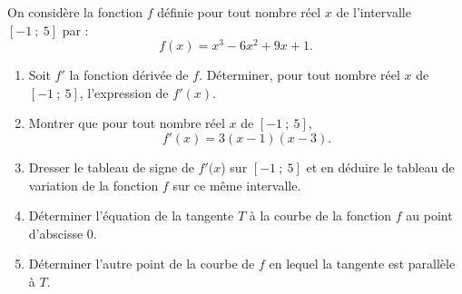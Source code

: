 \medskip

On considère la fonction $f$ définie pour tout nombre réel $x$  de l'intervalle $[-1~;~5]$ par : \[f(x)=x^3-6x^2+9x+1.\]

\begin{enumerate}
\item  Soit $f'$ la fonction dérivée de $f$. Déterminer, pour tout nombre réel $x$ de $[-1~;~5]$, l'expression de $f'(x)$.
\item Montrer que pour tout nombre réel $x$ de $[-1~;~5]$, \[f'(x) = 3(x - 1)(x - 3).\]
\item Dresser le tableau de signe de $f'(x$) sur $[-1~;~5]$ et en déduire le tableau de variation de la fonction $f$ sur ce même intervalle.
\item Déterminer l'équation de la tangente $T$ à la courbe de la fonction $f$ au point d'abscisse $0$.
\item Déterminer l'autre point de la courbe de $f$ en lequel la tangente est parallèle à $T$.
\end{enumerate}
